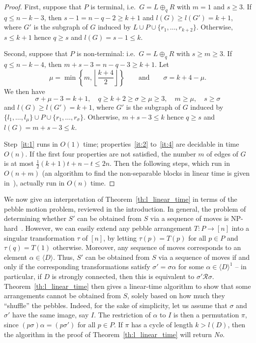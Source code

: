 \documentclass[ALCO,ThmDefs,Unicode,epreuves]{cedram}
\newcommand{\genset}[1]{\langle#1\rangle}
\newcommand{\R}{\mathcal{R}}
\begin{document}
\begin{proof}
 First, suppose that $P$ is terminal, i.e.\ $G = L \oplus_q R$ with $m = 1$ and
 $s \ge 3$. If $q \le n- k - 3$, then $s - 1 = n - q - 2 \ge k+1$ and $l(G)
 \ge l(G') = k + 1$, where $G'$ is the subgraph of $G$ induced by $L \cup P
 \cup \{r_1, \dots, r_{k+2}\}$. Otherwise, $s \le k+1$ hence $q \ge s$ and
 $l(G) = s - 1 \le k$.

 Second, suppose that $P$ is non-terminal: i.e.\ $G = L \oplus_q R$ with $s \ge
 m \ge 3$. If $q \le n- k - 4$, then $m + s - 3 = n - q - 3 \ge k+1$. Let 
\[
 \mu = \min \left\{ m, \left\lfloor \frac{k+4}{2} \right\rfloor \right\}
 \qquad\text{and}\qquad
 \sigma = k + 4 - \mu.
\]
 We then have 
 \[
 \sigma + \mu - 3 = k + 1, \quad q \ge k + 2 \ge \sigma \ge \mu \ge 3,
 \quad m \ge \mu, \quad s \ge \sigma
 \]
 and $l(G) \ge l(G') = k + 1$, where $G'$ is the subgraph of $G$ induced by
 $\{l_1, \dots, l_\mu\} \cup P \cup \{r_1, \dots, r_\sigma\}$. Otherwise, $m +
 s - 3 \le k$ hence $q \ge s$ and $l(G) = m + s - 3 \le k$.

 Step~\ref{it:1} runs in $O(1)$ time; properties~\ref{it:2} to~\ref{it:4} are
 decidable in time $O(n)$. If the first four properties are not satisfied, the
 number $m$ of edges of $G$ is at most $\frac{1}{2}(k+1)t + n-t \le 2n$. Then
 the following steps, which run in $O(n + m)$ (an algorithm to find the
 non-separable blocks in linear time is given in~\cite{Hopcroft1973aa}), actually run in
 $O(n)$ time.
\end{proof}

We now give an interpretation of Theorem~\ref{th:l_linear_time} in terms of the
pebble motion problem, reviewed in the introduction. In general, the problem of
determining whether $S'$ can be obtained from $S$ via a sequence of moves is
NP-hard~\cite{Ratner1990aa}. However, we can easily extend any pebble
arrangement $T : P \to [n]$ into a singular transformation $\tau$ of $[n]$, by
letting $\tau(p) = T(p)$ for all $p \in P$ and $\tau(q) = T(1)$ otherwise.
Moreover, any sequence of moves corresponds to an element $\alpha \in
\genset{D}$. Thus, $S'$ can be obtained from $S$ via a sequence of moves if and
only if the corresponding transformations satisfy $\sigma' = \sigma \alpha$ for
some $\alpha \in \genset{D}^1$ -- in particular, if $D$ is strongly connected,
then this is equivalent to $\sigma' \R \sigma$. Theorem~\ref{th:l_linear_time}
then gives a linear-time algorithm to show that some arrangements cannot be
obtained from $S$, solely based on how much they ``shuffle'' the pebbles.
Indeed, for the sake of simplicity, let us assume that $\sigma$ and $\sigma'$
have the same image, say $I$. The restriction of $\alpha$ to $I$ is then a
permutation $\pi$, since $(p \sigma) \alpha = (p \sigma')$ for all $p \in P$.
If $\pi$ has a cycle of length $k > l(D)$, then the algorithm in the proof of
Theorem~\ref{th:l_linear_time} will return \emph{No}.
\end{document}
